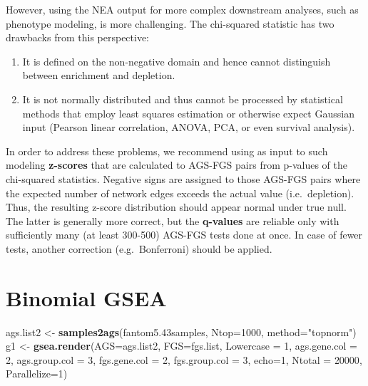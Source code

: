 \documentclass[]{article}
\newenvironment{Shaded}{\begin{snugshade}}{\end{snugshade}}
\newcommand{\KeywordTok}[1]{\textcolor[rgb]{0.13,0.29,0.53}{\textbf{#1}}}
\newcommand{\DataTypeTok}[1]{\textcolor[rgb]{0.13,0.29,0.53}{#1}}
\newcommand{\DecValTok}[1]{\textcolor[rgb]{0.00,0.00,0.81}{#1}}
\newcommand{\StringTok}[1]{\textcolor[rgb]{0.31,0.60,0.02}{#1}}
\newcommand{\NormalTok}[1]{#1}
\begin{document}
However, using the NEA output for more complex downstream analyses, such
as phenotype modeling, is more challenging. The chi-squared statistic
has two drawbacks from this perspective:

\begin{enumerate}
\def\labelenumi{\arabic{enumi})}
\item
  It is defined on the non-negative domain and hence cannot distinguish
  between enrichment and depletion.
\item
  It is not normally distributed and thus cannot be processed by
  statistical methods that employ least squares estimation or otherwise
  expect Gaussian input (Pearson linear correlation, ANOVA, PCA, or even
  survival analysis).
\end{enumerate}

In order to address these problems, we recommend using as input to such
modeling \textbf{z-scores} that are calculated to AGS-FGS pairs from
p-values of the chi-squared statistics. Negative signs are assigned to
those AGS-FGS pairs where the expected number of network edges exceeds
the actual value (i.e.~depletion). Thus, the resulting z-score
distribution should appear normal under true null. The latter is
generally more correct, but the \textbf{q-values} are reliable only with
sufficiently many (at least 300-500) AGS-FGS tests done at once. In case
of fewer tests, another correction (e.g.~Bonferroni) should be applied.

\hypertarget{gsea-run}{\section{Binomial GSEA}\label{gsea-run}}

\begin{Shaded}
\begin{Highlighting}[]
\NormalTok{ags.list2 <-}\StringTok{ }\KeywordTok{samples2ags}\NormalTok{(fantom5.43samples, }\DataTypeTok{Ntop=}\DecValTok{1000}\NormalTok{, }\DataTypeTok{method=}\StringTok{"topnorm"}\NormalTok{)}
\NormalTok{g1 <-}\StringTok{ }\KeywordTok{gsea.render}\NormalTok{(}\DataTypeTok{AGS=}\NormalTok{ags.list2, }\DataTypeTok{FGS=}\NormalTok{fgs.list, }\DataTypeTok{Lowercase =} \DecValTok{1}\NormalTok{, }
\DataTypeTok{ags.gene.col =} \DecValTok{2}\NormalTok{, }\DataTypeTok{ags.group.col =} \DecValTok{3}\NormalTok{, }\DataTypeTok{fgs.gene.col =} \DecValTok{2}\NormalTok{, }\DataTypeTok{fgs.group.col =} \DecValTok{3}\NormalTok{, }
\DataTypeTok{echo=}\DecValTok{1}\NormalTok{, }\DataTypeTok{Ntotal =} \DecValTok{20000}\NormalTok{, }\DataTypeTok{Parallelize=}\DecValTok{1}\NormalTok{)}
\end{Highlighting}
\end{Shaded}
\end{document}
